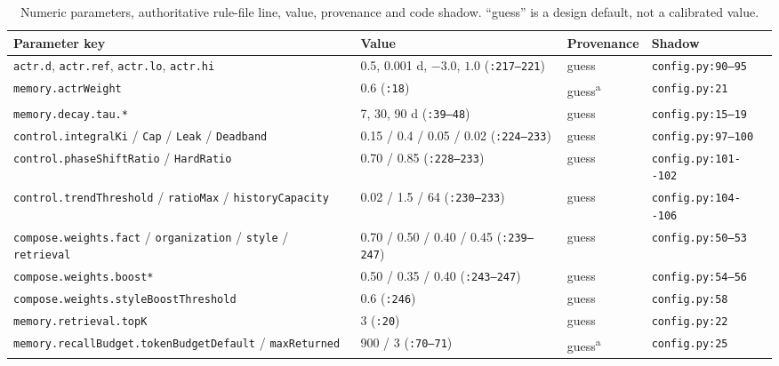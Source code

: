 \begin{table}[t]
\centering\scriptsize\setlength{\tabcolsep}{2.5pt}
\caption{Numeric parameters, authoritative rule-file line, value, provenance and
code shadow. ``guess'' is a design default, not a calibrated value.}\label{tab:params}
\begin{tabular}{@{}p{}p{}p{}p{}@{}}
\toprule
Parameter key & Value & Provenance & Shadow \\
\midrule
\texttt{actr.d}, \texttt{actr.ref}, \texttt{actr.lo}, \texttt{actr.hi} & 0.5, 0.001 d, $-3.0$, $1.0$ (\texttt{:217--221}) & guess & \texttt{config.py:90--95} \\
\texttt{memory.actrWeight} & 0.6 (\texttt{:18}) & guess\textsuperscript{a} & \texttt{config.py:21} \\
\texttt{memory.\allowbreak{}decay.\allowbreak{}tau.\allowbreak{}*} & 7, 30, 90 d (\texttt{:39--48}) & guess & \texttt{config.py:15--19} \\
\texttt{control.\allowbreak{}integralKi} / \texttt{Cap} / \texttt{Leak} / \texttt{Deadband} & 0.15 / 0.4 / 0.05 / 0.02 (\texttt{:224--233}) & guess & \texttt{config.py:97--100} \\
\texttt{control.\allowbreak{}phaseShiftRatio} / \texttt{HardRatio} & 0.70 / 0.85 (\texttt{:228--233}) & guess & \texttt{config.\allowbreak{}py:\allowbreak{}101-\allowbreak{}-\allowbreak{}102} \\
\texttt{control.\allowbreak{}trendThreshold} / \texttt{ratioMax} / \texttt{historyCapacity} & 0.02 / 1.5 / 64 (\texttt{:230--233}) & guess & \texttt{config.\allowbreak{}py:\allowbreak{}104-\allowbreak{}-\allowbreak{}106} \\
\texttt{compose.\allowbreak{}weights.\allowbreak{}fact} / \texttt{organization} / \texttt{style} / \texttt{retrieval} & 0.70 / 0.50 / 0.40 / 0.45 (\texttt{:239--247}) & guess & \texttt{config.py:50--53} \\
\texttt{compose.\allowbreak{}weights.\allowbreak{}boost*} & 0.50 / 0.35 / 0.40 (\texttt{:243--247}) & guess & \texttt{config.py:54--56} \\
\texttt{compose.\allowbreak{}weights.\allowbreak{}styleBoostThreshold} & 0.6 (\texttt{:246}) & guess & \texttt{config.py:58} \\
\texttt{memory.\allowbreak{}retrieval.\allowbreak{}topK} & 3 (\texttt{:20}) & guess & \texttt{config.py:22} \\
\texttt{memory.\allowbreak{}recallBudget.\allowbreak{}tokenBudgetDefault} / \texttt{maxReturned} & 900 / 3 (\texttt{:70--71}) & guess\textsuperscript{a} & \texttt{config.py:25} \\

\end{tabular}
\end{table}
